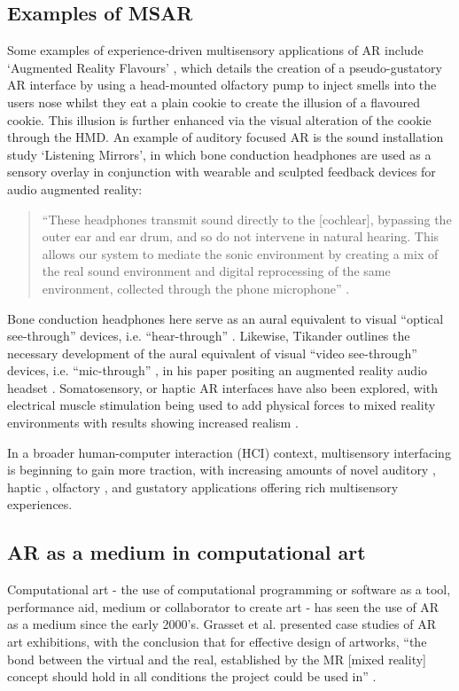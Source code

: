 \subsection{Examples of MSAR}                   \label{sec: area-literature-msarexamples}
Some examples of experience-driven multisensory applications of AR include ‘Augmented Reality Flavours’ \citep{narumi2011}, which details the creation of a pseudo-gustatory AR interface by using a head-mounted olfactory pump to inject smells into the users nose whilst they eat a plain cookie to create the illusion of a flavoured cookie. This illusion is further enhanced via the visual alteration of the cookie through the HMD. An example of auditory focused AR is the sound installation study ‘Listening Mirrors', in which bone conduction headphones are used as a sensory overlay in conjunction with wearable and sculpted feedback devices for audio augmented reality: 
\begin{quote}
    “These headphones transmit sound directly to the [cochlear], bypassing the outer ear and ear drum, and so do not intervene in natural hearing. This allows our system to mediate the sonic environment by creating a mix of the real sound environment and digital reprocessing of the same environment, collected through the phone microphone” \citep{kiefer2018}. 
\end{quote}
Bone conduction headphones here serve as an aural equivalent to visual “optical see-through” devices, i.e. “hear-through” \citep{lindeman2008}. Likewise, Tikander outlines the necessary development of the aural equivalent of visual “video see-through” devices, i.e. “mic-through” \citep{lindeman2008}, in his paper positing an augmented reality audio headset \citeyearpar{tikander2008}. Somatosensory, or haptic AR interfaces have also been explored, with electrical muscle stimulation being used to add physical forces to mixed reality environments with results showing increased realism \citep{lopes2017}.

In a broader human-computer interaction (HCI) context, multisensory interfacing is beginning to gain more traction, with increasing amounts of novel auditory \citep[p. 77]{barde2018}, haptic \citep{lopes2017,sheffield2016,maggioni2017,seah2015,vi2017a}, olfactory \citep{brooks2020}, and gustatory \citep{spence2015,vi2017a} applications offering rich multisensory experiences.


\subsection{AR as a medium in computational art}    \label{sec: area-literature-arart}
Computational art - the use of computational programming or software as a tool, performance aid, medium or collaborator to create art - has seen the use of AR as a medium since the early 2000’s. Grasset et al. presented case studies of AR art exhibitions, with the conclusion that for effective design of artworks, “the bond between the virtual and the real, established by the MR [mixed reality] concept should hold in all conditions the project could be used in” \citeyearpar{grasset2008}.

